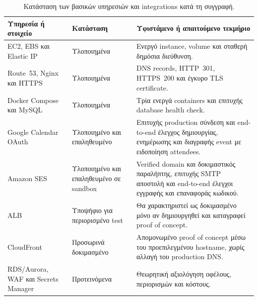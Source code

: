 \begin{table}[htbp]
\caption{Κατάσταση των βασικών υπηρεσιών και integrations κατά τη συγγραφή.}
\label{tab:service-status}
\centering
\begin{tabularx}{\textwidth}{@{}p{3.3cm}p{3.3cm}X@{}}
\toprule
\textbf{Υπηρεσία ή στοιχείο} & \textbf{Κατάσταση} & \textbf{Υφιστάμενο ή απαιτούμενο τεκμήριο} \\
\midrule
EC2, EBS και Elastic IP & Υλοποιημένα & Ενεργό instance, volume και σταθερή δημόσια διεύθυνση. \\
Route~53, Nginx και HTTPS & Υλοποιημένα & DNS records, HTTP~301, HTTPS~200 και έγκυρο TLS certificate. \\
Docker Compose και MySQL & Υλοποιημένα & Τρία ενεργά containers και επιτυχής database health check. \\
Google Calendar OAuth & Υλοποιημένο και επαληθευμένο & Επιτυχής production σύνδεση και end-to-end έλεγχος δημιουργίας, ενημέρωσης και διαγραφής event με ειδοποίηση attendees. \\
Amazon SES & Υλοποιημένο και επαληθευμένο σε sandbox & Verified domain και δοκιμαστικός παραλήπτης, επιτυχής SMTP αποστολή και end-to-end έλεγχοι εγγραφής και επαναφοράς κωδικού. \\
ALB & Υποψήφιο για περιορισμένο test & Θα χαρακτηριστεί ως δοκιμασμένο μόνο αν δημιουργηθεί και καταγραφεί proof of concept. \\
CloudFront & Προσωρινά δοκιμασμένο & Απομονωμένο proof of concept μέσω του προεπιλεγμένου hostname, χωρίς αλλαγή του production DNS. \\
RDS/Aurora, WAF και Secrets Manager & Προτεινόμενα & Θεωρητική αξιολόγηση οφέλους, περιορισμών και κόστους. \\
\bottomrule
\end{tabularx}
\end{table}
